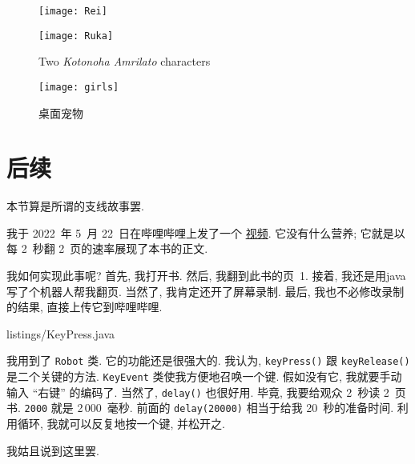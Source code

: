 \begin{figure}[h!]
    \centering
    \begin{minipage}{0.3\textwidth}
        \texttt{[image: Rei]}
    \end{minipage}
    \hspace{0.15\textwidth}
    \begin{minipage}{0.3\textwidth}
        \texttt{[image: Ruka]}
    \end{minipage}
    \caption{Two \textit{Kotonoha Amrilato} characters}
\end{figure}

\begin{figure}[h!]
    \centering
    \texttt{[image: girls]}
    \caption{桌面宠物}
    \label{fig:Girls}
\end{figure}

\section{后续}

\begin{remark*}
    本节算是所谓的支线故事罢.
\end{remark*}

我于 2022~年 5~月 22~日在哔哩哔哩上发了一个%
\href{https://www.bilibili.com/video/BV1JY4y157BX}{视频}.
它没有什么营养;
它就是以每 2~秒翻 2~页的速率展现了本书的正文.

我如何实现此事呢?
首先, 我打开书.
然后, 我翻到此书的页~1.
接着, 我还是用\gls{java}写了个机器人帮我翻页.
当然了, 我肯定还开了屏幕录制.
最后, 我也不必修改录制的结果, 直接上传它到哔哩哔哩.


{listings/KeyPress.java}

我用到了 \verb`Robot` 类.
它的功能还是很强大的.
我认为,
\verb`keyPress()` 跟 \verb`keyRelease()`
是二个关键的方法.
\verb`KeyEvent` 类使我方便地召唤一个键.
假如没有它,
我就要手动输入 ``右键'' 的编码了.
当然了, \verb`delay()` 也很好用.
毕竟, 我要给观众 2~秒读 2~页书.
\verb`2000` 就是 2\,000~毫秒.
前面的 \verb`delay(20000)` 相当于给我
20~秒的准备时间.
利用循环, 我就可以反复地按一个键, 并松开之.

我姑且说到这里罢.
